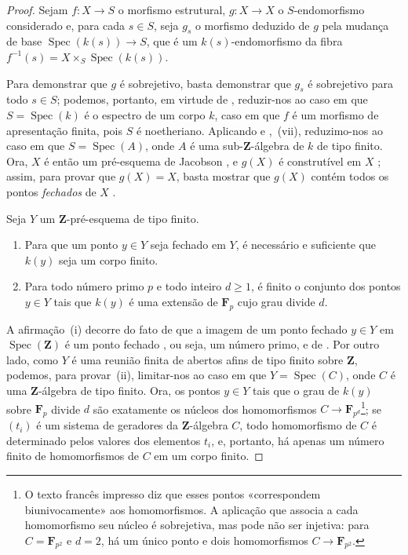 \begin{proof}
Sejam $f:X\to S$ o morfismo estrutural, $g:X\to X$ o $S$-endomorfismo considerado e, para cada $s\in S$, seja $g_s$ o morfismo deduzido de $g$ pela mudança de base $\operatorname{Spec}(k(s))\to S$, que é um $k(s)$-endomorfismo da fibra $f^{-1}(s)=X\times_S\operatorname{Spec}(k(s))$.

Para demonstrar que $g$ é sobrejetivo, basta demonstrar que $g_s$ é sobrejetivo para todo $s\in S$; podemos, portanto, em virtude de , reduzir-nos ao caso em que $S=\operatorname{Spec}(k)$ é o espectro de um corpo $k$, caso em que $f$ é um morfismo de apresentação finita, pois $S$ é noetheriano.
Aplicando  e ,~(vii), reduzimo-nos ao caso em que $S=\operatorname{Spec}(A)$, onde $A$ é uma sub-$\mathbf{Z}$-álgebra de $k$ de tipo finito.
Ora, $X$ é então um pré-esquema de Jacobson , e $g(X)$ é construtível em $X$ ; assim, para provar que $g(X)=X$, basta mostrar que $g(X)$ contém todos os pontos \emph{fechados} de $X$ .

\begin{lemma}[10.4.11.1]
\label{IV.10.4.11.1}
Seja $Y$ um $\mathbf{Z}$-pré-esquema de tipo finito.
\begin{enumerate}[label=(\roman*)]
  \item Para que um ponto $y\in Y$ seja fechado em $Y$, é necessário e suficiente que $k(y)$ seja um corpo finito.
  \item Para todo número primo $p$ e todo inteiro $d\geq 1$, é finito o conjunto dos pontos $y\in Y$ tais que $k(y)$ é uma extensão de $\mathbf{F}_p$ cujo grau divide $d$.
\end{enumerate}
\end{lemma}

A afirmação~(i) decorre do fato de que a imagem de um ponto fechado $y\in Y$ em $\operatorname{Spec}(\mathbf{Z})$ é um ponto fechado , ou seja, um número primo, e de .
Por outro lado, como $Y$ é uma reunião finita de abertos afins de tipo finito sobre $\mathbf{Z}$, podemos, para provar~(ii), limitar-nos ao caso em que $Y=\operatorname{Spec}(C)$, onde $C$ é uma $\mathbf{Z}$-álgebra de tipo finito.
Ora, os pontos $y\in Y$ tais que o grau de $k(y)$ sobre $\mathbf{F}_p$ divide $d$ são exatamente os núcleos dos homomorfismos $C\to\mathbf{F}_{p^d}$\footnote{O texto francês impresso diz que esses pontos «correspondem biunivocamente» aos homomorfismos. A aplicação que associa a cada homomorfismo seu núcleo é sobrejetiva, mas pode não ser injetiva: para $C=\mathbf{F}_{p^2}$ e $d=2$, há um único ponto e dois homomorfismos $C\to\mathbf{F}_{p^2}$.}; se $(t_i)$ é um sistema de geradores da $\mathbf{Z}$-álgebra $C$, todo homomorfismo de $C$ é determinado pelos valores dos elementos $t_i$, e, portanto, há apenas um número finito de homomorfismos de $C$ em um corpo finito.


\end{proof}
